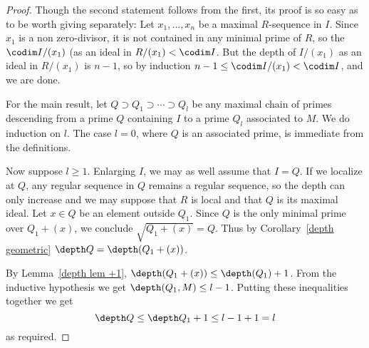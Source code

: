 \begin{proof}
Though the second statement follows from the first, its proof is so easy as to be worth giving separately: Let $x_1,\dots,x_n$ be a maximal $R$-sequence in $I$. Since $x_1$ is a non zero-divisor, it is not contained
in any minimal prime of $R$, so the $\codim I/(x_1)$ (as an ideal in $R/(x_1)<\codim I$. But the depth of $I/(x_1)$ as an ideal in $R/(x_1)$ is $n-1$, so by induction $n-1\leq\codim I/(x_1)<\codim I$, and we are done.\par
For the main result, let $Q\supset Q_1\supset\cdots\supset Q_l$ be any maximal chain of primes descending from a prime $Q$ containing $I$ to a prime $Q_l$ associated to $M$. We do induction on $l$. The case $l=0$, where $Q$ is an associated prime, is immediate from the definitions.\par
Now suppose $l\geq 1$. Enlarging $I$, we may as well assume that $I=Q$. If
we localize at $Q$, any regular sequence in $Q$ remains a regular sequence, so the depth can only increase and we may suppose that $R$ is local and that $Q$ is its maximal ideal. Let $x\in Q$ be an element outside $Q_1$. Since $Q$ is the only minimal prime over $Q_1+(x)$, we conclude $\sqrt{Q_1+(x)}=Q$. Thus by Corollary~\ref{depth geometric} $\depth Q=\depth(Q_1+(x))$.\par
By Lemma~\ref{depth lem +1}, $\depth(Q_1+(x))\leq\depth(Q_1)+1$. From the inductive hypothesis we get $\depth(Q_1,M)\leq l-1$. Putting these inequalities together we get 
\[\depth Q\leq\depth Q_1+1\leq l-1+1=l\] 
as required.
\end{proof}
